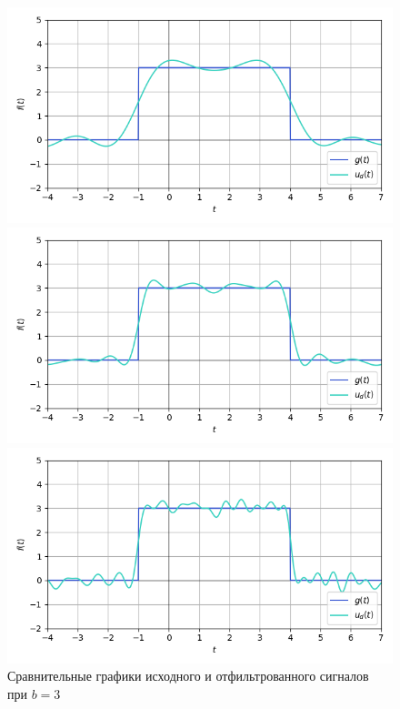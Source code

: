 \documentclass[a4paper]{article}
\begin{document}
\begin{figure}[H]
    \begin{minipage}{0.33\textwidth}
        \centering \includegraphics[width=\textwidth]{sources/low-pass filter/denoised (b=3, v=3).png}
        \caption{$v = 3$}
    \end{minipage}\hfill
    \begin{minipage}{0.33\textwidth}
        \centering \includegraphics[width=\textwidth]{sources/low-pass filter/denoised (b=3, v=7).png}
        \caption{$v = 7$}
    \end{minipage}\hfill
    \begin{minipage}{0.33\textwidth}
        \centering \includegraphics[width=\textwidth]{sources/low-pass filter/denoised (b=3, v=13).png}
        \caption{$v = 13$}
    \end{minipage}
    \caption*{Сравнительные графики исходного и отфильтрованного сигналов при $b=3$}
\end{figure}
\end{document}
